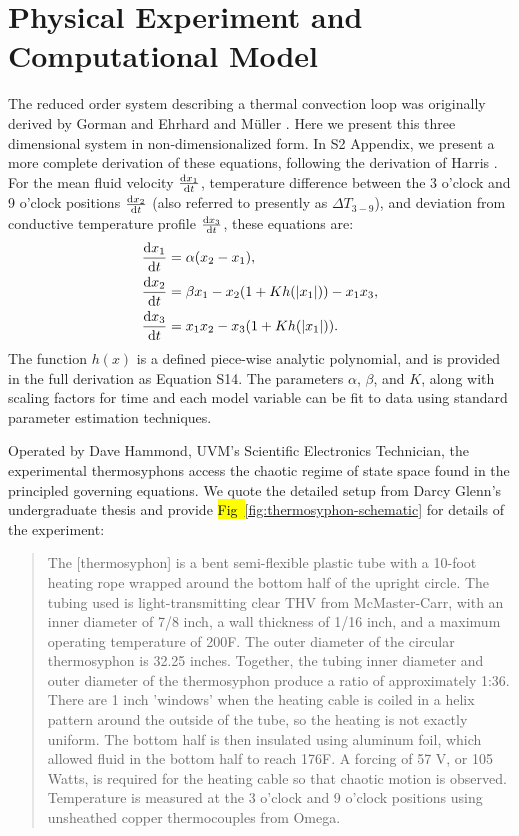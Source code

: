 \documentclass[10pt,letterpaper]{article}
\newcommand{\diff}[2]{\frac{{\rm d}#1}{{\rm d}#2}}
\begin{document}
\section*{Physical Experiment and Computational Model}

The reduced order system describing a thermal convection loop was originally derived by Gorman \cite{gorman1986} and Ehrhard and M\"{u}ller \cite{ehrhard1990dynamical}.
Here we present this three dimensional system in non-dimensionalized form.
In S2 Appendix, we present a more complete derivation of these equations, following the derivation of Harris \cite{harris2011predicting}.
For the mean fluid velocity $\diff{x_1}{t}$, temperature difference between the 3 o'clock and 9 o'clock positions $\diff{x_2}{t}$ (also referred to presently as $\Delta T_{3-9}$), and deviation from conductive temperature profile $\diff{x_3}{t}$, these equations are:
\begin{align}
& \diff{x_1}{t} = \alpha (x_2 - x_1),\\
& \diff{x_2}{t} = \beta x_1 - x_2 (1 + Kh(|x_1|)) - x_1x_3,\\
  & \diff{x_3}{t} = x_1x_2 - x_3 (1 + Kh(|x_1|)) .\end{align}
The function $h(x)$ is a defined piece-wise analytic polynomial, and is provided in the full derivation as Equation S14.
The parameters $\alpha$, $\beta$, and $K$, along with scaling factors for time and each model variable can be fit to data using standard parameter estimation techniques.

Operated by Dave Hammond, UVM's Scientific Electronics Technician, the experimental thermosyphons access the chaotic regime of state space found in the principled governing equations.
We quote the detailed setup from Darcy Glenn's undergraduate thesis \cite{glenn2013} and provide \hl{Fig~}\ref{fig:thermosyphon-schematic} for details of the experiment:
\begin{quote}
The [thermosyphon] is a bent semi-flexible plastic tube with a 10-foot heating rope wrapped around the bottom half of the upright circle.
The tubing used is light-transmitting clear THV from McMaster-Carr, with an inner diameter of 7/8 inch, a wall thickness of 1/16 inch, and a maximum operating temperature of 200F.
The outer diameter of the circular thermosyphon is 32.25 inches.
Together, the tubing inner diameter and outer diameter of the thermosyphon produce a ratio of approximately 1:36.
There are 1 inch 'windows' when the heating cable is coiled in a helix pattern around the outside of the tube, so the heating is not exactly uniform.
The bottom half is then insulated using aluminum foil, which allowed fluid in the bottom half to reach 176F.
A forcing of 57 V, or 105 Watts, is required for the heating cable so that chaotic motion is observed.
Temperature is measured at the 3 o'clock and 9 o'clock positions using unsheathed copper thermocouples from Omega.
\end{quote}
\end{document}
